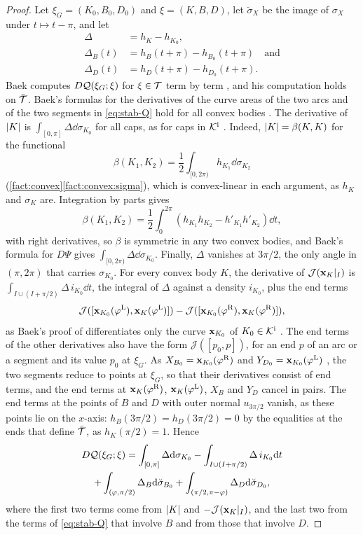 \begin{proof}
Let $\xi_G=(K_0,B_0,D_0)$ and $\xi=(K,B,D)$, let $\breve\sigma_X$ be the image
of $\sigma_X$ under $t\mapsto t-\pi$, and let
\begin{align*}
  \Delta&=h_K-h_{K_0},\\
  \Delta_B(t)&=h_B(t+\pi)-h_{B_0}(t+\pi)\quad\text{and}\\
  \Delta_D(t)&=h_D(t+\pi)-h_{D_0}(t+\pi).
\end{align*}
Baek computes $D\mathcal{Q}(\xi_G;\xi)$ for $\xi\in\mathcal{T}$ term by term , and his computation holds on $\bar{\mathcal{T}}$. Baek's formulas for the
derivatives of the curve areas of the two arcs and of the two segments in
\eqref{eq:stab-Q} hold for all convex bodies . The
derivative of $\lvert K\rvert$ is $\int_{[0,\pi]}\Delta\dd\sigma_{K_0}$ for all caps,
as for caps in $\mathcal{K}^{\mathrm{i}}$ . Indeed, $\lvert K\rvert=\beta(K,K)$ for the
functional
\[
  \beta(K_1,K_2)=\frac12\int_{[0,2\pi)}h_{K_1}\dd\sigma_{K_2}
\]
(\cref{fact:convex}\ref{fact:convex:sigma}), which is convex-linear in each
argument, as $h_K$ and $\sigma_K$ are. Integration by parts gives
\[
  \beta(K_1,K_2)=\frac12\int_0^{2\pi}(h_{K_1}h_{K_2}-h'_{K_1}h'_{K_2})\dd t,
\]
with right derivatives, so $\beta$ is symmetric in any two convex bodies, and
Baek's formula for $D\Psi$ gives $\int_{[0,2\pi)}\Delta\dd\sigma_{K_0}$. Finally,
$\Delta$ vanishes at $3\pi/2$, the only angle in $(\pi,2\pi)$ that carries
$\sigma_{K_0}$. For every convex body $K$, the derivative of
$\mathcal J(\mathbf{x}_K|_I)$ is $\int_{I\cup(I+\pi/2)}\Delta\,i_{K_0}\dd t$, the
integral of $\Delta$ against a density $i_{K_0}$, plus the end terms
\[
  \mathcal J([\mathbf{x}_{K_0}(\varphi^{\mathrm L}),\mathbf{x}_K(\varphi^{\mathrm L})])
  -\mathcal J([\mathbf{x}_{K_0}(\varphi^{\mathrm R}),\mathbf{x}_K(\varphi^{\mathrm R})]),
\]
as Baek's proof of  differentiates only the curve $\mathbf{x}_{K_0}$
of $K_0\in\mathcal{K}^{\mathrm{i}}$ . The end terms of the other derivatives also
have the form $\mathcal J([p_0,p])$, for an end $p$ of an arc or a segment and
its value $p_0$ at $\xi_G$. As $X_{B_0}=\mathbf{x}_{K_0}(\varphi^{\mathrm R})$ and
$Y_{D_0}=\mathbf{x}_{K_0}(\varphi^{\mathrm L})$ , the two segments
reduce to points at $\xi_G$, so that their derivatives consist of end terms, and
the end terms at $\mathbf{x}_K(\varphi^{\mathrm R})$, $\mathbf{x}_K(\varphi^{\mathrm L})$,
$X_B$ and $Y_D$ cancel in pairs. The end terms at the points of $B$ and $D$
with outer normal $u_{3\pi/2}$ vanish, as these points lie on the $x$-axis:
$h_B(3\pi/2)=h_D(3\pi/2)=0$ by the equalities at the ends that define
$\bar{\mathcal{T}}$, as $h_K(\pi/2)=1$. Hence
\begin{multline*}
  D\mathcal{Q}(\xi_G;\xi)=\int_{[0,\pi]}\Delta\mathrm{d}\sigma_{K_0}
  -\int_{I\cup(I+\pi/2)}\Delta\,i_{K_0}\mathrm{d} t\\
  +\int_{(\varphi,\pi/2)}\Delta_B\mathrm{d}\breve\sigma_{B_0}
  +\int_{(\pi/2,\pi-\varphi)}\Delta_D\mathrm{d}\breve\sigma_{D_0},
\end{multline*}
where the first two terms come from $\lvert K\rvert$ and $-\mathcal J(\mathbf{x}_K|_I)$, and
the last two from the terms of \eqref{eq:stab-Q} that involve $B$ and from those
that involve $D$.


\end{proof}

